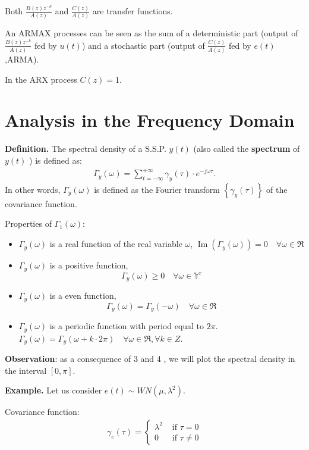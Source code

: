 Both $\frac{B(z) z^{-k}}{A(z)}$ and $\frac{C(z)}{A(z)}$ are transfer functions.

An ARMAX processes can be seen as the sum of a deterministic part (output of $\frac{B(z) z^{-k}}{A(z)}$ fed by $u(t)$) and a stochastic part (output of $\frac{C(z)}{A(z)}$ fed by $e(t)$,ARMA).

In the ARX process $C(z)=1$.

\section{Analysis in the Frequency Domain}
\textbf{Definition.}
The spectral density of a S.S.P. $y(t)$ (also called the \textbf{spectrum} of $y(t)$ ) is defined as:
\begin{align*}
	\Gamma_{y}(\omega)=\sum_{t=-\infty}^{+\infty} \gamma_{y}(\tau) \cdot e^{-j \omega \tau}.
\end{align*}
In other words, $\Gamma_y(\omega)$ is defined as the Fourier transform $\left\{\gamma_{y}(\tau)\right\}$ of the covariance function.

Properties of $\Gamma_{1}(\omega)$:
\begin{itemize}
	\item $\Gamma_{y}(\omega)$ is a real function of the real variable $\omega$, $\operatorname{Im}\left(\Gamma_{y}(\omega)\right)=0 \quad \forall \omega \in \Re$
	\item $\Gamma_{y}(\omega)$ is a positive function,
	$$
		\Gamma_{y}(\omega) \geq 0 \quad \forall \omega \in \mathbb{Y}^{\mathrm{r}}
	$$
	\item $\Gamma_{y}(\omega)$ is a even function,
	$$
		\Gamma_{y}(\omega)=\Gamma_{y}(-\omega) \quad \forall \omega \in \Re
	$$
	\item $\Gamma_{y}(\omega)$ is a periodic function with period equal to $2 \pi$.  $\Gamma_{y}(\omega)=\Gamma_{y}(\omega+k \cdot 2 \pi) \quad \forall \omega \in \Re, \forall k \in Z$.
\end{itemize}

\textbf{Observation}: as a consequence of 3 and 4 , we will plot the spectral density in the interval $[0, \pi]$.

\textbf{Example.} Let us consider $e(t) \sim W N\left(\mu, \lambda^{2}\right)$. 

Covariance function:
\begin{align*}
	\gamma_{e}(\tau)= \begin{cases}\lambda^{2} & \text { if } \tau=0 \\ 0 & \text { if } \tau \neq 0\end{cases}
\end{align*}


